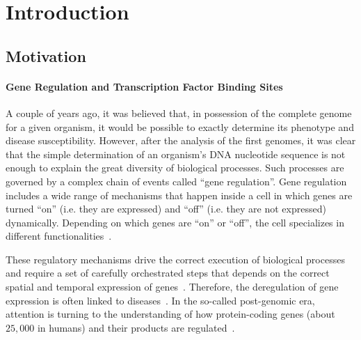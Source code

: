 \chapter{Introduction}
\label{cha:introduction}

\graphicspath{{chapter1/figs/}}

\section{Motivation}
\label{sec:problem.motivation}

\subsubsection{Gene Regulation and Transcription Factor Binding Sites}

A couple of years ago, it was believed that, in possession of the complete genome for a given organism, it would be possible to exactly determine its phenotype and disease susceptibility. However, after the analysis of the first genomes, it was clear that the simple determination of an organism's DNA nucleotide sequence is not enough to explain the great diversity of biological processes. Such processes are governed by a complex chain of events called ``gene regulation''. Gene regulation includes a wide range of mechanisms that happen inside a cell in which genes are turned ``on'' (i.e. they are expressed) and ``off'' (i.e. they are not expressed) dynamically. Depending on which genes are ``on'' or ``off'', the cell specializes in different functionalities~\citep{maston2006}.

These regulatory mechanisms drive the correct execution of biological processes and require a set of carefully orchestrated steps that depends on the correct spatial and temporal expression of genes~\citep{maston2006}. Therefore, the deregulation of gene expression is often linked to diseases~\citep{encode2012}. In the so-called post-genomic era, attention is turning to the understanding of how protein-coding genes (about $25,000$ in humans) and their products are regulated~\citep{maston2006}.

